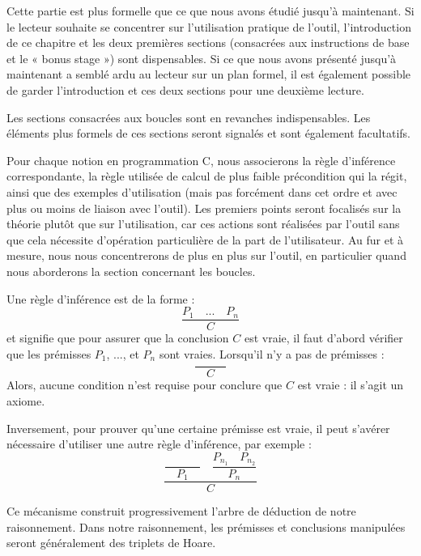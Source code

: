 

\begin{Information}
Cette partie est plus formelle que ce que nous avons étudié jusqu'à maintenant.
Si le lecteur souhaite se concentrer sur l'utilisation pratique de l'outil, l'introduction
de ce chapitre et les deux premières sections (consacrées aux instructions de base et
le « bonus stage ») sont dispensables. Si ce que nous avons présenté jusqu'à
maintenant a semblé ardu au lecteur sur un plan formel, il est également possible
de garder l'introduction et ces deux sections pour une deuxième lecture.

Les sections consacrées aux boucles sont en revanches indispensables. Les éléments plus
formels de ces sections seront signalés et sont également facultatifs.
\end{Information}


Pour chaque notion en programmation C, nous associerons la règle d'inférence
correspondante, la règle utilisée de calcul de plus faible précondition qui la
régit, ainsi que des exemples d'utilisation (mais pas forcément dans cet ordre et avec
plus ou moins de liaison avec l'outil). Les premiers points seront focalisés sur
la théorie plutôt que sur l'utilisation, car ces actions sont réalisées par l'outil
sans que cela nécessite d'opération particulière de la part de l'utilisateur.
Au fur et à mesure, nous nous concentrerons de plus en plus sur l'outil, en
particulier quand nous aborderons la section concernant les boucles.





Une règle d'inférence est de la forme :
$$\dfrac{P_1 \quad ... \quad P_n}{C}$$
et signifie que pour assurer que la conclusion $C$ est vraie, il faut d'abord
vérifier que les prémisses $P_1$, ..., et $P_n$ sont vraies. Lorsqu'il n'y a
pas de prémisses :
$$\dfrac{}{\quad C \quad}$$
Alors, aucune condition n'est requise pour conclure que $C$ est vraie : il s'agit un axiome.


Inversement, pour prouver qu'une certaine prémisse est vraie, il peut s'avérer
nécessaire d'utiliser une autre règle d'inférence, par exemple :
$$\dfrac{\dfrac{}{\quad P_1\quad} \quad \dfrac{P_{n_1}\quad P_{n_2}}{P_n}}{C}$$


Ce mécanisme construit progressivement l'arbre de déduction de notre raisonnement.
Dans notre raisonnement, les prémisses et conclusions manipulées seront
généralement des triplets de Hoare.




